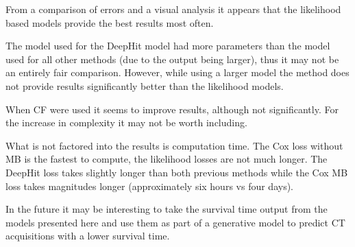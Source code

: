         From a comparison of errors and a visual analysis it appears that the likelihood based models provide the best results most often.
        
        The model used for the DeepHit model had more parameters than the model used for all other methods (due to the output being larger), thus it may not be an entirely fair comparison. However, while using a larger model the method does not provide results significantly better than the likelihood models.
        
        When \gls{CF} were used it seems to improve results, although not significantly. For the increase in complexity it may not be worth including.
        
        What is not factored into the results is computation time. The Cox loss without \gls{MB} is the fastest to compute, the likelihood losses are not much longer. The DeepHit loss takes slightly longer than both previous methods while the Cox \gls{MB} loss takes magnitudes longer (approximately six hours vs four days).
    
        In the future it may be interesting to take the survival time output from the models presented here and use them as part of a generative model to predict \gls{CT} acquisitions with a lower survival time.
    